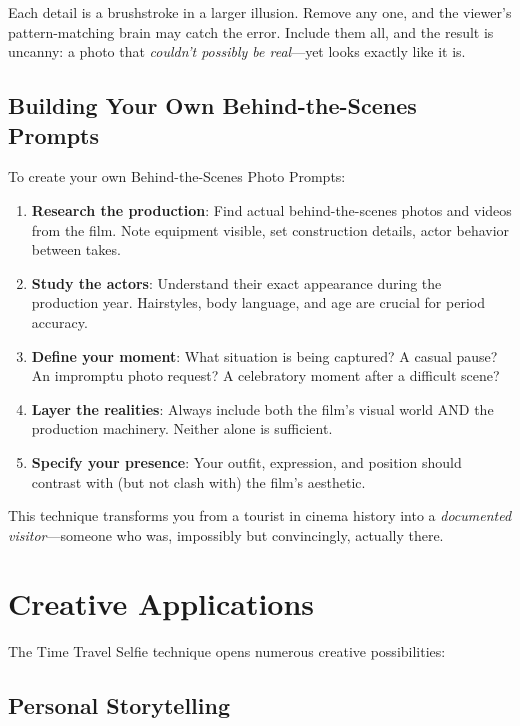 Each detail is a brushstroke in a larger illusion. Remove any one, and the viewer's pattern-matching brain may catch the error. Include them all, and the result is uncanny: a photo that \textit{couldn't possibly be real}—yet looks exactly like it is.

\subsection{Building Your Own Behind-the-Scenes Prompts}

To create your own Behind-the-Scenes Photo Prompts:

\begin{enumerate}
\item \textbf{Research the production}: Find actual behind-the-scenes photos and videos from the film. Note equipment visible, set construction details, actor behavior between takes.

\item \textbf{Study the actors}: Understand their exact appearance during the production year. Hairstyles, body language, and age are crucial for period accuracy.

\item \textbf{Define your moment}: What situation is being captured? A casual pause? An impromptu photo request? A celebratory moment after a difficult scene?

\item \textbf{Layer the realities}: Always include both the film's visual world AND the production machinery. Neither alone is sufficient.

\item \textbf{Specify your presence}: Your outfit, expression, and position should contrast with (but not clash with) the film's aesthetic.
\end{enumerate}

This technique transforms you from a tourist in cinema history into a \textit{documented visitor}—someone who was, impossibly but convincingly, actually there.

\section{Creative Applications}
\label{sec:creative-applications}

The Time Travel Selfie technique opens numerous creative possibilities:

\subsection{Personal Storytelling}

